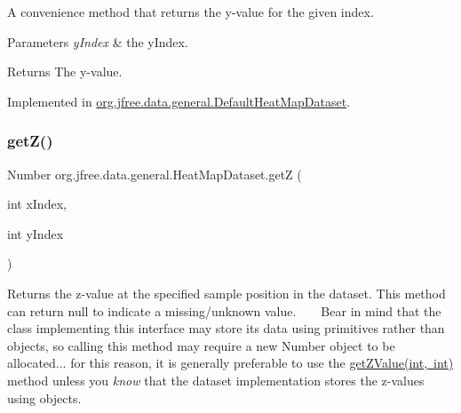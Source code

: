 A convenience method that returns the y-\/value for the given index.


\begin{DoxyParams}{Parameters}
{\em y\+Index} & the y\+Index.\\
\hline
\end{DoxyParams}
\begin{DoxyReturn}{Returns}
The y-\/value. 
\end{DoxyReturn}


Implemented in \mbox{\hyperlink{classorg_1_1jfree_1_1data_1_1general_1_1_default_heat_map_dataset_a8fcca5de20effdeea0e7decf94425d6d}{org.\+jfree.\+data.\+general.\+Default\+Heat\+Map\+Dataset}}.

\mbox{\label{interfaceorg_1_1jfree_1_1data_1_1general_1_1_heat_map_dataset_a9f2a3fb4e25c9364781e0aeb32ef91c5}} 
\subsubsection{\texorpdfstring{get\+Z()}{getZ()}}
{\footnotesize\ttfamily Number org.\+jfree.\+data.\+general.\+Heat\+Map\+Dataset.\+getZ (\begin{DoxyParamCaption}\item[{int}]{x\+Index,  }\item[{int}]{y\+Index }\end{DoxyParamCaption})}

Returns the z-\/value at the specified sample position in the dataset. This method can return {\ttfamily null} to indicate a missing/unknown value. ~\newline
~\newline
 Bear in mind that the class implementing this interface may store its data using primitives rather than objects, so calling this method may require a new {\ttfamily Number} object to be allocated... for this reason, it is generally preferable to use the \mbox{\hyperlink{interfaceorg_1_1jfree_1_1data_1_1general_1_1_heat_map_dataset_ad4c5c315a22d263edf0da447693fb0d7}{get\+Z\+Value(int, int)}} method unless you {\itshape know} that the dataset implementation stores the z-\/values using objects.


